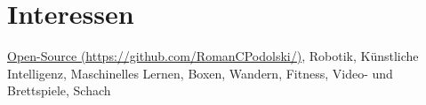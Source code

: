 \documentclass[a4paper,10pt]{article} %
\begin{document}
 
 
\section{Interessen}
 
\href{https://github.com/RomanCPodolski}{Open-Source (\faGithub https://github.com/RomanCPodolski/)}, Robotik, Künstliche Intelligenz, Maschinelles Lernen,
Boxen, Wandern, Fitness, Video- und Brettspiele, Schach
 
 
\newpage
 
\end{document}
